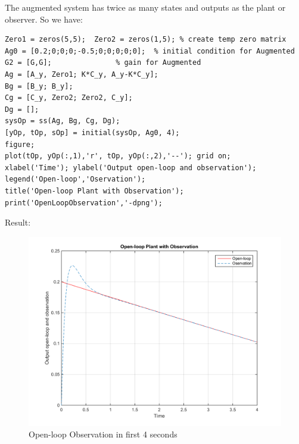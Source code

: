 \documentclass[14pt,a4paper]{article}
\begin{document}
	The augmented system has twice as many states and outputs as the plant or observer. So we have: \\
\begin{lstlisting}
Zero1 = zeros(5,5);  Zero2 = zeros(1,5); % create temp zero matrix
Ag0 = [0.2;0;0;0;-0.5;0;0;0;0;0];  % initial condition for Augmented
G2 = [G,G];               % gain for Augmented
Ag = [A_y, Zero1; K*C_y, A_y-K*C_y];
Bg = [B_y; B_y];
Cg = [C_y, Zero2; Zero2, C_y];
Dg = [];
sysOp = ss(Ag, Bg, Cg, Dg);
[yOp, tOp, sOp] = initial(sysOp, Ag0, 4);
figure;
plot(tOp, yOp(:,1),'r', tOp, yOp(:,2),'--'); grid on;
xlabel('Time'); ylabel('Output open-loop and observation');
legend('Open-loop','Oservation');
title('Open-loop Plant with Observation');
print('OpenLoopObservation','-dpng');
\end{lstlisting}
	Result: 
	\begin{figure}[htp]
		\begin{center}
			\includegraphics[scale = 0.7]{OpenLoopObservation.png}
			\caption{Open-loop Observation in first 4 seconds}
		\end{center}
	\end{figure}
	\pagebreak
	
\end{document}
